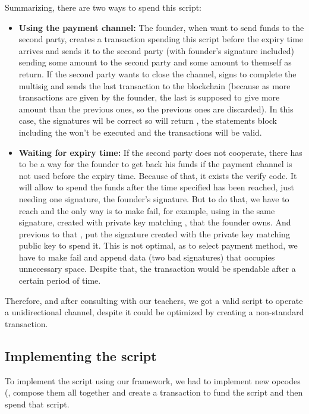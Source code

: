 Summarizing, there are two ways to spend this script:
\begin{itemize}
    \item \textbf{Using the payment channel:} The founder, when want to send funds to the second party, creates a transaction spending this script before the expiry time arrives and sends it to the second party (with founder's signature included) sending some amount to the second party and some amount to themself as return. If the second party wants to close the channel, signs to complete the multisig and sends the last transaction to the blockchain (because as more transactions are given by the founder, the last is supposed to give more amount than the previous ones, so the previous ones are discarded). In this case, the signatures wil be correct so  will return , the  statements block including the  won't be executed and the transactions will be valid.
    \item \textbf{Waiting for expiry time:} If the second party does not cooperate, there has to be a way for the founder to get back his funds if the payment channel is not used before the expiry time. Because of that, it exists the  verify code. It will allow to spend the funds after the time specified has been reached, just needing one signature, the founder's signature. But to do that, we have to reach  and the only way is to make  fail, for example, using in  the same signature, created with private key matching , that the founder owns. And previous to that , put the signature created with the private key matching  public key to spend it. This is not optimal, as to select payment method, we have to make  fail and append data (two bad signatures) that occupies unnecessary space. Despite that, the transaction would be spendable after a certain period of time.
\end{itemize}
Therefore, and after consulting with our teachers, we got a valid script to operate a unidirectional channel, despite it could be optimized by creating a non-standard transaction.
\subsection{Implementing the script}
To implement the script using our framework, we had to implement new opcodes (, compose them all together and create a transaction to fund the script and then spend that script.

